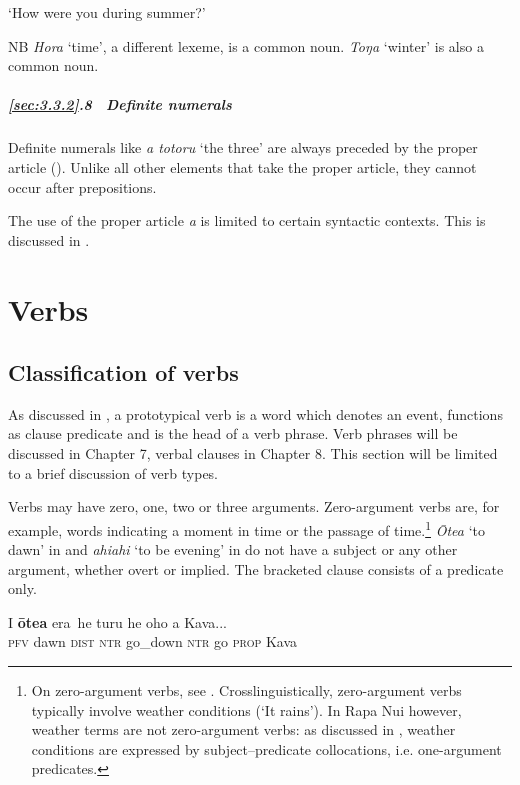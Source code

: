 \glt
‘How were you during summer?’ \textstyleExampleref{[R334.051]} 
\z

NB \textit{Hora} ‘time’, a different lexeme, is a common noun. \textit{Toŋa} ‘winter’ is also a common noun.

\subparagraph{\ref{sec:3.3.2}.8~ Definite numerals} Definite numerals like \textit{a totoru} ‘the three’ are always preceded by the proper article (). Unlike all other elements that take the proper article, they cannot occur after prepositions.

The use of the proper article \textit{a} is limited to certain syntactic contexts. This is discussed in .\textstyleExampleref{\textbf{}} 
\section{Verbs}\label{sec:3.4}
\subsection{Classification of verbs}\label{sec:3.4.1}
As discussed in , a prototypical verb is a word which denotes an event, functions as clause predicate and is the head of a verb phrase. Verb phrases will be discussed in Chapter 7, verbal clauses in Chapter 8. This section will be limited to a brief discussion of verb types.

Verbs may have zero, one, two or three arguments. Zero-argument verbs are, for example, words indicating a moment in time or the passage of time.\footnote{\label{fn:113}On zero-argument verbs, see \citet[267]{Dryer2007Clause}. Crosslinguistically, zero-argument verbs typically involve weather conditions (‘It rains’). In Rapa Nui however, weather terms are not zero-argument verbs: as discussed in , weather conditions are expressed by subject–predicate collocations, i.e. one-argument predicates.} \textit{{\ꞌ}Ōtea} ‘to dawn’ in  and \textit{ahiahi} ‘to be evening’ in  do not have a subject or any other argument, whether overt or implied. The bracketed clause consists of a predicate only.

\ea\label{ex:3.82}
\gll {\ob}I \textbf{{\ꞌ}ōtea} era\,{\cb} he turu he oho a Kava...\\
{\db}\textsc{pfv} dawn \textsc{dist} \textsc{ntr} go\_down \textsc{ntr} go \textsc{prop} Kava\\

